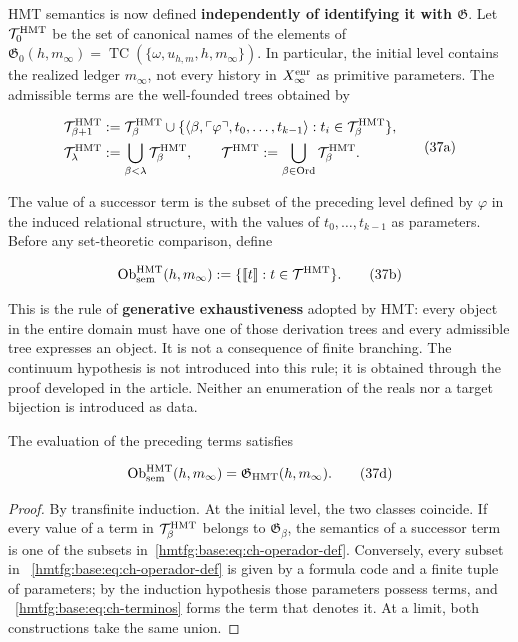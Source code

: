 HMT semantics is now defined \textbf{independently of identifying it with
\(\mathfrak G\)}. Let \(\mathcal T_0^{\rm HMT}\) be the set of canonical names
of the elements of
\(\mathfrak G_0(h,m_\infty)=
\operatorname{TC}(\{\omega,u_{h,m},h,m_\infty\})\). In particular, the
initial level contains the realized ledger \(m_\infty\), not every history
in \(X_\infty^{\rm enr}\) as primitive parameters. The admissible terms are
the well-founded trees obtained by

\[
 \begin{aligned}
 \mathcal T^{\rm HMT}_{\beta+1}
 &:={\mathcal T}^{\rm HMT}_\beta\cup
 \{\langle\beta,\ulcorner\varphi\urcorner,
       t_0,\ldots,t_{k-1}\rangle:
       t_i\in\mathcal T^{\rm HMT}_\beta\},\\
 \mathcal T^{\rm HMT}_\lambda&:=
       \bigcup_{\beta<\lambda}\mathcal T^{\rm HMT}_\beta,
 \qquad
 \mathcal T^{\rm HMT}:=
       \bigcup_{\beta\in\operatorname{Ord}}\mathcal T^{\rm HMT}_\beta.
 \end{aligned}
\tag{37a}\label{hmtfg:base:eq:ch-terminos}
\]

The value of a successor term is the subset of the preceding level defined by
\(\varphi\) in the induced relational structure, with the values of
\(t_0,\ldots,t_{k-1}\) as parameters. Before any set-theoretic comparison,
define

\[
 \operatorname{Ob}_{\rm sem}^{\rm HMT}(h,m_\infty)
 :=\{\llbracket t\rrbracket:t\in\mathcal T^{\rm HMT}\}.
\tag{37b}\label{hmtfg:base:eq:ch-objetos-semanticos}
\]

This is the rule of \textbf{generative exhaustiveness} adopted by HMT: every object in the entire domain must have one of those derivation trees and every admissible tree expresses an object. It is not a consequence of finite branching. The continuum hypothesis is not introduced into this rule; it is obtained through the proof developed in the article. Neither an enumeration of the reals nor a target bijection is introduced as data.

\begin{theorem}
\label{hmtfg:base:thm:ch-6a}
The evaluation of the preceding terms satisfies

\[
 \operatorname{Ob}_{\rm sem}^{\rm HMT}(h,m_\infty)
 =\mathfrak G_{\rm HMT}(h,m_\infty).
\tag{37d}\label{hmtfg:base:eq:ch-equivalencia-semantica}
\]

\end{theorem}
\begin{proof}
By transfinite induction. At the initial level, the two classes coincide. If
every value of a term in \(\mathcal T^{\rm HMT}_\beta\) belongs to
\(\mathfrak G_\beta\), the semantics of a successor term is one of the subsets
in~\eqref{hmtfg:base:eq:ch-operador-def}. Conversely, every subset in
~\eqref{hmtfg:base:eq:ch-operador-def} is given by a formula code and a finite tuple of
parameters; by the induction hypothesis those parameters possess terms, and
~\eqref{hmtfg:base:eq:ch-terminos} forms the term that denotes it. At a limit, both
constructions take the same union.
\end{proof}

